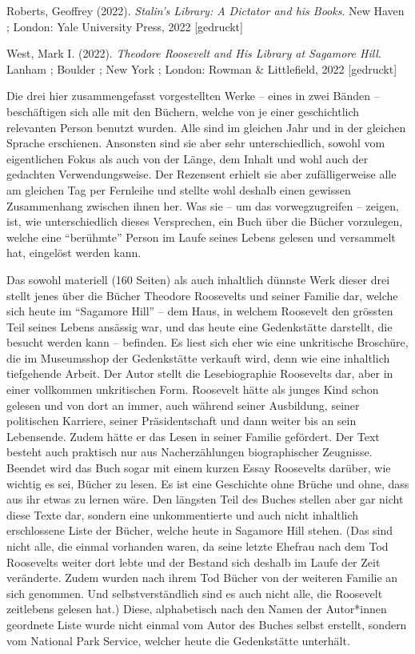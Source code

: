 \documentclass[a4paper,
fontsize=11pt,
oneside,
numbers=noperiodatend,
parskip=half-,
bibliography=totoc,
final
]{scrartcl}
\begin{document}
Roberts, Geoffrey (2022). \emph{Stalin's Library: A Dictator and his
Books}. New Haven ; London: Yale University Press, 2022 {[}gedruckt{]}

West, Mark I. (2022). \emph{Theodore Roosevelt and His Library at
Sagamore Hill}. Lanham ; Boulder ; New York ; London: Rowman \&
Littlefield, 2022 {[}gedruckt{]}

Die drei hier zusammengefasst vorgestellten Werke -- eines in zwei
Bänden -- beschäftigen sich alle mit den Büchern, welche von je einer
geschichtlich relevanten Person benutzt wurden. Alle sind im gleichen
Jahr und in der gleichen Sprache erschienen. Ansonsten sind sie aber
sehr unterschiedlich, sowohl vom eigentlichen Fokus als auch von der
Länge, dem Inhalt und wohl auch der gedachten Verwendungsweise. Der
Rezensent erhielt sie aber zufälligerweise alle am gleichen Tag per
Fernleihe und stellte wohl deshalb einen gewissen Zusammenhang zwischen
ihnen her. Was sie -- um das vorwegzugreifen -- zeigen, ist, wie
unterschiedlich dieses Versprechen, ein Buch über die Bücher vorzulegen,
welche eine \enquote{berühmte} Person im Laufe seines Lebens gelesen und
versammelt hat, eingelöst werden kann.

Das sowohl materiell (160 Seiten) als auch inhaltlich dünnste Werk
dieser drei stellt jenes über die Bücher Theodore Roosevelts und seiner
Familie dar, welche sich heute im \enquote{Sagamore Hill} -- dem Haus,
in welchem Roosevelt den grössten Teil seines Lebens ansässig war, und
das heute eine Gedenkstätte darstellt, die besucht werden kann --
befinden. Es liest sich eher wie eine unkritische Broschüre, die im
Museumsshop der Gedenkstätte verkauft wird, denn wie eine inhaltlich
tiefgehende Arbeit. Der Autor stellt die Lesebiographie Roosevelts dar,
aber in einer vollkommen unkritischen Form. Roosevelt hätte als junges
Kind schon gelesen und von dort an immer, auch während seiner
Ausbildung, seiner politischen Karriere, seiner Präsidentschaft und dann
weiter bis an sein Lebensende. Zudem hätte er das Lesen in seiner
Familie gefördert. Der Text besteht auch praktisch nur aus
Nacherzählungen biographischer Zeugnisse. Beendet wird das Buch sogar
mit einem kurzen Essay Roosevelts darüber, wie wichtig es sei, Bücher zu
lesen. Es ist eine Geschichte ohne Brüche und ohne, dass aus ihr etwas
zu lernen wäre. Den längsten Teil des Buches stellen aber gar nicht
diese Texte dar, sondern eine unkommentierte und auch nicht inhaltlich
erschlossene Liste der Bücher, welche heute in Sagamore Hill stehen.
(Das sind nicht alle, die einmal vorhanden waren, da seine letzte
Ehefrau nach dem Tod Roosevelts weiter dort lebte und der Bestand sich
deshalb im Laufe der Zeit veränderte. Zudem wurden nach ihrem Tod Bücher
von der weiteren Familie an sich genommen. Und selbstverständlich sind
es auch nicht alle, die Roosevelt zeitlebens gelesen hat.) Diese,
alphabetisch nach den Namen der Autor*innen geordnete Liste wurde nicht
einmal vom Autor des Buches selbst erstellt, sondern vom National Park
Service, welcher heute die Gedenkstätte unterhält.
\end{document}
